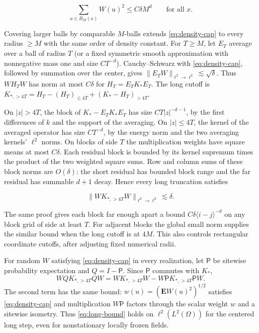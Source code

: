 \documentclass[11pt]{article}
\begin{document}
\begin{equation}\label{eq:density-cap}
\sum_{u\in B_M(x)} W(u)^2 \le C\delta M^d \qquad\text{for all }x.
\end{equation}

Covering larger balls by comparable \(M\)-balls extends \eqref{eq:density-cap} to every radius \(\ge M\) with the same order of density constant. For \(T\ge M\), let \(E_T\) average over a ball of radius \(T\) (or a fixed symmetric smooth approximation with nonnegative mass one and size \(CT^{-d}\)). Cauchy--Schwarz with \eqref{eq:density-cap}, followed by summation over the center, gives \(\|E_T W\|_{\ell^2\to\ell^2}\lesssim\sqrt\delta\). Thus \(W H_T W\) has norm at most \(C\delta\) for \(H_T=E_T K_* E_T\). The long cutoff is \(K_{*,>4T}=H_T-(H_T)_{\le4T}+(K_*-H_T)_{>4T}\).

On \(|z|>4T\), the block of \(K_*-E_T K_*E_T\) has size \(C T|z|^{-d-1}\), by the first differences of \(k\) and the support of the averaging. On \(|z|\le4T\), the kernel of the averaged operator has size \(C T^{-d}\), by the energy norm and the two averaging kernels' \(\ell^2\) norms. On blocks of side \(T\) the multiplication weights have square means at most \(C\delta\). Each residual block is bounded by its kernel supremum times the product of the two weighted square sums. Row and column sums of these block norms are \(O(\delta)\): the short residual has bounded block range and the far residual has summable \(d+1\) decay. Hence every long truncation satisfies

\begin{equation}\label{eq:long-bound}
\|W K_{*,>4T}W\|_{\ell^2\to\ell^2}\lesssim\delta .
\end{equation}

The same proof gives each block far enough apart a bound \(C\delta\langle i-j\rangle^{-d}\) on any block grid of side at least \(T\). For adjacent blocks the global small norm supplies the similar bound when the long cutoff is at \(4M\). This also controls rectangular coordinate cutoffs, after adjusting fixed numerical radii.

For random \(W\) satisfying \eqref{eq:density-cap} in every realization, let \(\mathsf P\) be sitewise probability expectation and \(Q=I-\mathsf P\). Since \(\mathsf P\) commutes with \(K_*\), \[
W Q K_{*,>4T} Q W=W K_{*,>4T} W-W\mathsf P K_{*,>4T}\mathsf P W .
\] The second term has the same bound: \(w(u)=(\mathbf E W(u)^2)^{1/2}\) satisfies \eqref{eq:density-cap} and multiplication \(W\mathsf P\) factors through the scalar weight \(w\) and a sitewise isometry. Thus \eqref{eq:long-bound} holds on \(\ell^2(L^2(\Omega))\) for the centered long step, even for nonstationary locally frozen fields.
\end{document}
